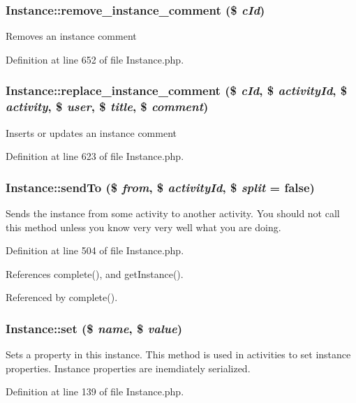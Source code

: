 \subsubsection{\setlength{\rightskip}{0pt plus 5cm}Instance::remove\_\-instance\_\-comment (\$ {\em c\-Id})}\label{classInstance_a28}


Removes an instance comment 

Definition at line 652 of file Instance.php.
\subsubsection{\setlength{\rightskip}{0pt plus 5cm}Instance::replace\_\-instance\_\-comment (\$ {\em c\-Id}, \$ {\em activity\-Id}, \$ {\em activity}, \$ {\em user}, \$ {\em title}, \$ {\em comment})}\label{classInstance_a27}


Inserts or updates an instance comment 

Definition at line 623 of file Instance.php.
\subsubsection{\setlength{\rightskip}{0pt plus 5cm}Instance::send\-To (\$ {\em from}, \$ {\em activity\-Id}, \$ {\em split} = false)}\label{classInstance_a25}


Sends the instance from some activity to another activity. You should not call this method unless you know very very well what you are doing. 

Definition at line 504 of file Instance.php.

References complete(), and get\-Instance().

Referenced by complete().
\subsubsection{\setlength{\rightskip}{0pt plus 5cm}Instance::set (\$ {\em name}, \$ {\em value})}\label{classInstance_a4}


Sets a property in this instance. This method is used in activities to set instance properties. Instance properties are inemdiately serialized. 

Definition at line 139 of file Instance.php.
